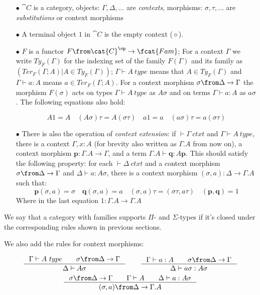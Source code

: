 \begin{itemize}
  \item[$\bullet$] $\cat{C}$ is a category, objects: $\Gamma, \Delta, \dots$ are
    \emph{contexts}, morphisms:  $\sigma, \tau, \dots$ are
    \emph{substitutions} or context morphisms

  \item[$\bullet$] A terminal object $1$ in $\cat{C}$ is the empty context ($\diamond$).

  \item[$\bullet$] $F$ is a functor $F\from \cat{C}^\op \to \fcat{Fam}$; For a
    context $\Gamma$ we write $Ty_F(\Gamma)$ for the indexing set of the family
    $F(\Gamma)$ and its family as $(Ter_F(\Gamma;A) | A \in Ty_F(\Gamma))$;
    $\Gamma \vdash A~type$ means that $A \in Ty_F(\Gamma)$ and $\Gamma \vdash a
    : A$ means $a \in Ter_F(\Gamma;A)$. For a context morphism $\sigma \from
    \Delta \to \Gamma$ the morphism $F(\sigma)$ acts on types $\Gamma \vdash
    A~type$ as $A\sigma$ and on terms $\Gamma \vdash a : A$ as $a\sigma$. The
    following equations also hold:

    \[
      A1=A \quad (A\sigma)\tau = A(\sigma\tau) \quad a1=a \quad (a\sigma)\tau=a(\sigma\tau)
    \]

  \item[$\bullet$] There is also the operation of \emph{context extension}: if
    $\vdash \Gamma~ctxt$ and $\Gamma \vdash A~type$, there is a context
    $\Gamma, x:A$ (for brevity also written as $\Gamma.A$ from now on), a
    context morphism $\mathbf{p}: \Gamma.A \to \Gamma$, and a term $\Gamma.A
    \vdash \mathbf{q} : A \mathbf{p}$. This should satisfy the following
    property: for each $\vdash \Delta~ctxt$ and a context morphism
    $\sigma \from \Delta \to \Gamma$ and $\Delta \vdash a : A \sigma$, there is
    a context morphism $(\sigma, a): \Delta \to \Gamma.A$ such that:
    \[
      \mathbf{p}(\sigma, a) = \sigma \quad \mathbf{q}(\sigma, a) = a \quad (\sigma, a) \tau =
      (\sigma \tau, a \tau) \quad (\mathbf{p}, \mathbf{q}) = 1
    \]
    Where in the last equation $1: \Gamma.A \to \Gamma.A$
\end{itemize}

We say that a category with families supports $\Pi$- and $\Sigma$-types if it's
closed under the corresponding rules shown in previous sections.

We also add the rules for context morphisms:

\[
  \inference{\Gamma \vdash A~type \qquad \sigma \from \Delta \to \Gamma}{\Delta \vdash A\sigma} \qquad
  \inference{\Gamma \vdash a : A \qquad \sigma \from \Delta \to \Gamma}{\Delta \vdash a\sigma : A\sigma}
\]
\[
  \inference{\sigma \from \Delta \to \Gamma \qquad \Gamma \vdash A \qquad \Delta \vdash a : A\sigma}{(\sigma, a) \from \Delta \to \Gamma.A}
\]

